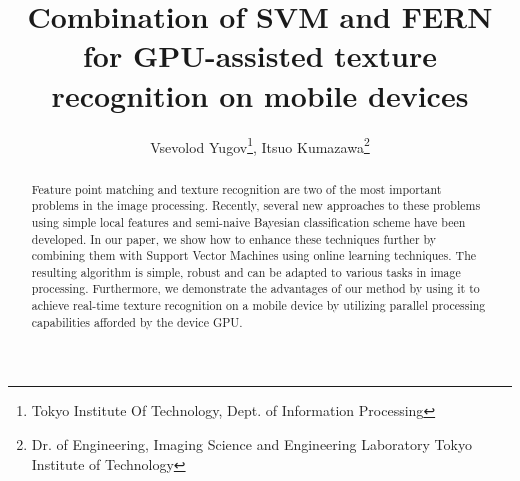 \documentclass[10pt,twocolumn, a4paper]{article}
\title{Combination of SVM and FERN for GPU-assisted texture recognition on mobile devices}
\author{Vsevolod Yugov\thanks{Tokyo Institute Of Technology, Dept. of Information Processing}, Itsuo Kumazawa\thanks{Dr. of Engineering,
Imaging Science and Engineering Laboratory 
Tokyo Institute of Technology 
}}
\begin{document}
\maketitle

\begin{abstract}
Feature point matching and texture recognition are two of the most important problems in the image processing. Recently, several new approaches to these problems using simple local features and semi-naive Bayesian classification scheme have been developed. In our paper, we show how to enhance these techniques further by combining them with Support Vector Machines using online learning techniques. The resulting algorithm is simple, robust and can be adapted to various tasks in image processing. Furthermore, we demonstrate the advantages of our method by using it to achieve real-time texture recognition on a mobile device by utilizing parallel processing capabilities afforded by the device GPU.
\end{abstract}
\end{document}
